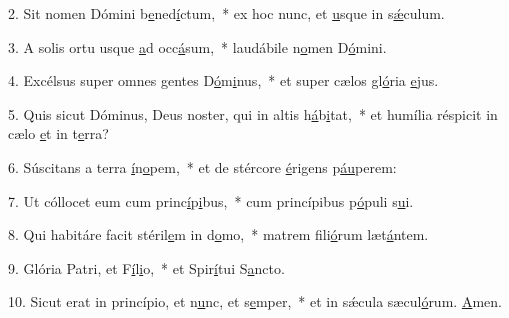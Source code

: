 2. Sit nomen Dómini b\uline{e}ned\uline{í}ctum,~* ex hoc nunc, et \uline{u}sque in s\uline{ǽ}culum.\par 
3. A solis ortu usque \uline{a}d occ\uline{á}sum,~* laudábile n\uline{o}men D\uline{ó}mini.\par 
4. Excélsus super omnes gentes D\uline{ó}m\uline{i}nus,~* et super cælos gl\uline{ó}ria \uline{e}jus.\par 
5. Quis sicut Dóminus, Deus noster, qui in altis h\uline{á}b\uline{i}tat,~* et humília réspicit in cælo \uline{e}t in t\uline{e}rra?\par 
6. Súscitans a terra \uline{í}n\uline{o}pem,~* et de stércore \uline{é}rigens p\uline{áu}perem:\par 
7. Ut cóllocet eum cum princ\uline{í}p\uline{i}bus,~* cum princípibus p\uline{ó}puli s\uline{u}i.\par 
8. Qui habitáre facit stéril\uline{e}m in d\uline{o}mo,~* matrem fili\uline{ó}rum læt\uline{á}ntem.\par 
9. Glória Patri, et F\uline{í}l\uline{i}o,~* et Spir\uline{í}tui S\uline{a}ncto.\par 
10. Sicut erat in princípio, et n\uline{u}nc, et s\uline{e}mper,~* et in sǽcula sæcul\uline{ó}rum. \uline{A}men.\par 
